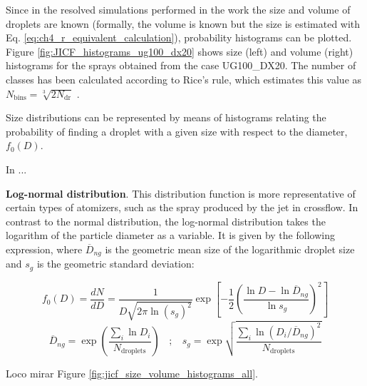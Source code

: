 Since in the resolved simulations performed in the work the size and volume of droplets are known (formally, the volume is known but the size is estimated with Eq. \ref{eq:ch4_r_equivalent_calculation}), probability histograms can be plotted. Figure \ref{fig:JICF_histograms_ug100_dx20} shows size (left) and volume (right) histograms for the sprays obtained from the case UG100\_DX20. The number of classes has been calculated according to Rice's rule, which estimates this value as $N_\mathrm{bins} = \sqrt[3]{2 N_\mathrm{dr}}$ .




Size distributions can be represented by means of histograms relating the probability of finding a droplet with a given size with respect to the diameter, $f_0 \left( D \right)$.



In  ...



\textbf{Log-normal distribution}. This distribution function is more representative of certain types of atomizers, such as the spray produced by the jet in crossflow. In contrast to the normal distribution, the log-normal distribution takes the logarithm of the particle diameter as a variable. It is given by the following expression, where $\overline{D}_{ng}$ is the geometric mean size of the logarithmic droplet size and $s_g$ is the geometric standard deviation:

\begin{equation}
 f_0 \left( D \right) = \frac{d N}{d D} =  \frac{1}{D  \sqrt{2 \pi \ln \left( s_g \right)^2}} \exp \left[ - \frac{1}{2 } \left( \frac{\ln D - \ln \overline{D}_{ng}}{\ln s_g}   \right)^2 \right]
\end{equation}
%
\begin{equation}
\overline{D}_{ng} = \exp \left(  \frac{\sum_i \ln D_i }{N_\mathrm{droplets}} \right)  ~~~~ ; ~~~~ 
s_g = \exp \sqrt{  \frac{\sum_i \ln \left( D_i / \overline{D}_{ng} \right) ^2 }{N_\mathrm{droplets}} }
\end{equation}

Loco mirar Figure \ref{fig:jicf_size_volume_histograms_all}.

\clearpage



